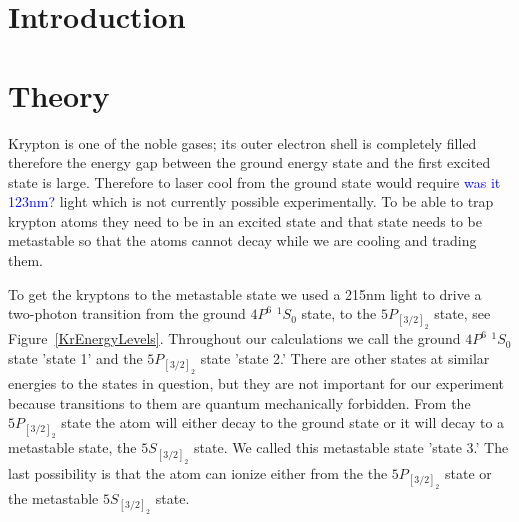\documentclass[prb,preprint]{revtex4-1}
\begin{document}
\title{}


\author{Danika Luntz-Martin}

\author{William Williams}

\date{\today}

\begin{abstract}


\end{abstract}


\maketitle 


\section{Introduction} 


\section{Theory}

Krypton is one of the noble gases; its outer electron shell is completely filled therefore the energy gap between the ground energy state and the first excited state is large. Therefore to laser cool from the ground state would require \textcolor{blue}{was it 123nm?} light which is not currently possible experimentally. To be able to trap krypton atoms they need to be in an excited state and that state needs to be metastable so that the atoms cannot decay while we are cooling and trading them. 

To get the kryptons to the metastable state we used a 215nm light to drive a two-photon transition from the ground $4P^6$ $^1S_0$ state, to the $5P_{[3/2]_2}$ state, see Figure~\ref{KrEnergyLevels}. Throughout our calculations we call the ground $4P^6$ $^1S_0$ state 'state 1' and the $5P_{[3/2]_2}$ state 'state 2.' There are other states at similar energies to the states in question, but they are not important for our experiment because transitions to them are quantum mechanically forbidden. From the $5P_{[3/2]_2}$ state the atom will either decay to the ground state or it will decay to a metastable state, the $5S_{[3/2]_2}$ state. We called this metastable state 'state 3.' The last possibility is that the atom can ionize either from the the $5P_{[3/2]_2}$ state or the metastable $5S_{[3/2]_2}$ state. 
\end{document}
